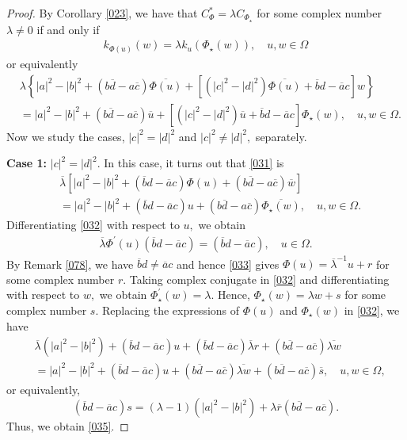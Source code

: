 \documentclass[11pt]{amsart}%
\theoremstyle{definition}
\theoremstyle{remark}
\numberwithin{equation}{section}
\begin{document}
\begin{proof}
By Corollary \ref{023}, we have that $C_{\Phi}^{\ast}=\lambda C_{\Phi_{\star}%
}$ for some complex number $\lambda\neq0$ if and only if
\begin{align*}
k_{\Phi(u)}(w)=\lambda k_{u}(\Phi_{\star}(w)),\quad u,w\in\Omega
\end{align*}
or equivalently
\begin{align}\label{031}
&  \lambda\left\{  |a|^{2}-|b|^{2}+(b\overline{d}-a\overline{c})\overline
{\Phi(u)}+[(|c|^{2}-|d|^{2})\overline{\Phi(u)}+\overline{b}d-\overline
{a}c]w\right\} \\
&  =|a|^{2}-|b|^{2}+(b\overline{d}-a\overline{c})\overline{u}+[(|c|^{2}%
-|d|^{2})\overline{u}+\overline{b}d-\overline{a}c]\Phi_{\star}(w),\quad
u,w\in\Omega.\nonumber
\end{align}
Now we study the cases, $|c|^{2}=|d|^{2}$ and $|c|^{2}\neq|d|^{2},$ separately.

\textbf{Case 1:} $|c|^{2}=|d|^{2}.$ \newline In this case, it turns out that
\eqref{031} is
\begin{align}\label{032}
&  \overline{\lambda}[  |a|^{2}-|b|^{2}+(\overline{b}d-\overline
{a}c)\Phi(u)+(b\overline{d}-a\overline{c})\overline{w}] \\
&  =|a|^{2}-|b|^{2}+(\overline{b}d-\overline{a}c)u+(b\overline{d}%
-a\overline{c})\overline{\Phi_{\star}(w)},\quad u,w\in\Omega.\nonumber
\end{align}
Differentiating \eqref{032} with respect to $u,$ we obtain
\begin{align}\label{033}
\overline{\lambda}\Phi^{\prime}(u)(\overline{b}d-\overline{a}c)=(\overline
{b}d-\overline{a}c),\quad u\in\Omega.
\end{align}
By Remark \ref{078}, we have $\overline{b}d\neq\overline{a}c$ and hence
\eqref{033} gives $\Phi(u)=\overline{\lambda}^{-1}u+r$ for some complex number
$r.$ Taking complex conjugate in \eqref{032} and differentiating with respect
to $w,$ we obtain $\Phi_{\star}^{\prime}(w)=\lambda.$ Hence, $\Phi_{\star
}(w)=\lambda w+s$ for some complex number $s.$ Replacing the expressions of
$\Phi(u)$ and $\Phi_{\star}(w)$ in \eqref{032}, we have
\begin{align*}
&  \overline{\lambda}(|a|^{2}-|b|^{2})+(\overline{b}d-\overline{a}%
c)u+(\overline{b}d-\overline{a}c)\overline{\lambda}r+(b\overline{d}%
-a\overline{c})\overline{\lambda w}\\
&  =|a|^{2}-|b|^{2}+(\overline{b}d-\overline{a}c)u+(b\overline{d}%
-a\overline{c})\overline{\lambda w}+(b\overline{d}-a\overline{c})\overline
{s},\quad u,w\in\Omega,
\end{align*}
or equivalently,
\[
(\overline{b}d-\overline{a}c)s
=(\lambda-1)(|a|^{2}-|b|^{2})+\lambda\overline{r}(b\overline
{d}-a\overline{c}).
\]
Thus, we obtain \eqref{035}.


\end{proof}
\end{document}
